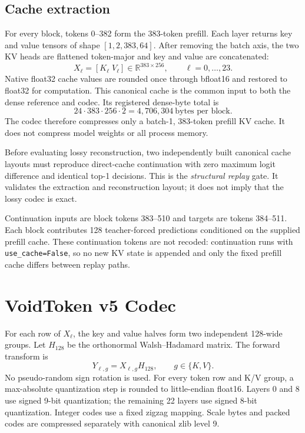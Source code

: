 \documentclass[10pt,twocolumn]{article}
\newcommand{\R}{\mathbb{R}}
\begin{document}
\subsection{Cache extraction}

For every block, tokens 0--382 form the 383-token prefill. Each layer returns
key and value tensors of shape $[1,2,383,64]$. After removing the batch axis,
the two KV heads are flattened token-major and key and value are concatenated:
\begin{equation}
  X_\ell=[K_\ell\;V_\ell]\in\R^{383\times256},
  \qquad \ell=0,\ldots,23.
\end{equation}
Native float32 cache values are rounded once through bfloat16 and restored to
float32 for computation. This canonical cache is the common input to both the
dense reference and codec. Its registered dense-byte total is
\begin{equation}
  24\cdot383\cdot256\cdot2
  =4{,}706{,}304\ \text{bytes per block}.
  \label{eq:dense-bytes}
\end{equation}
The codec therefore compresses only a batch-1, 383-token prefill KV cache. It
does not compress model weights or all process memory.

Before evaluating lossy reconstruction, two independently built canonical
cache layouts must reproduce direct-cache continuation with zero maximum logit
difference and identical top-1 decisions. This is the \emph{structural replay}
gate. It validates the extraction and reconstruction layout; it does not imply
that the lossy codec is exact.

Continuation inputs are block tokens 383--510 and targets are tokens
384--511. Each block contributes 128 teacher-forced predictions conditioned on
the supplied prefill cache. These continuation tokens are not recoded:
continuation runs with \texttt{use\_cache=False}, so no new KV state is
appended and only the fixed prefill cache differs between replay paths.

\section{VoidToken v5 Codec}
\label{sec:codec}

For each row of $X_\ell$, the key and value halves form two independent
128-wide groups. Let $H_{128}$ be the orthonormal Walsh--Hadamard matrix. The
forward transform is
\begin{equation}
  Y_{\ell,g}=X_{\ell,g}H_{128},
  \qquad g\in\{K,V\}.
\end{equation}
No pseudo-random sign rotation is used. For every token row and K/V group, a
max-absolute quantization step is rounded to little-endian float16. Layers 0
and 8 use signed 9-bit quantization; the remaining 22 layers use signed 8-bit
quantization. Integer codes use a fixed zigzag mapping. Scale bytes and packed
codes are compressed separately with canonical zlib level 9.
\end{document}
